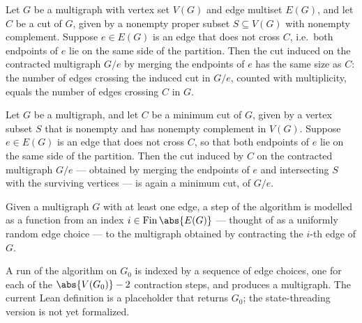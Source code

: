 \begin{lemma}
\label{cut_size_preserved}
\leanok
{}
Let $G$ be a multigraph with vertex set $V(G)$ and edge multiset $E(G)$, and let $C$ be
a cut of $G$, given by a nonempty proper subset $S \subseteq V(G)$ with nonempty
complement. Suppose $e \in E(G)$ is an edge that does not cross $C$, i.e.\ both
endpoints of $e$ lie on the same side of the partition. Then the cut induced on the
contracted multigraph $G/e$ by merging the endpoints of $e$ has the same size as $C$:
the number of edges crossing the induced cut in $G/e$, counted with multiplicity, equals
the number of edges crossing $C$ in $G$.
\end{lemma}

\begin{lemma}
\label{mincut_preserved_of_non_crossing}
\leanok
{}
Let $G$ be a multigraph, and let $C$ be a minimum cut of $G$, given by a vertex subset
$S$ that is nonempty and has nonempty complement in $V(G)$. Suppose $e \in E(G)$ is an
edge that does not cross $C$, so that both endpoints of $e$ lie on the same side of the
partition. Then the cut induced by $C$ on the contracted multigraph $G/e$ — obtained by
merging the endpoints of $e$ and intersecting $S$ with the surviving vertices — is again
a minimum cut, of $G/e$.
\end{lemma}

\begin{definition}
\label{kargerStep}
\leanok
{}
Given a multigraph $G$ with at least one edge, a step of the algorithm is modelled as a
function from an index $i \in \mathrm{Fin}\,\abs{E(G)}$ — thought of as a uniformly
random edge choice — to the multigraph obtained by contracting the $i$-th edge of $G$.
\end{definition}

\begin{definition}
\label{kargerRun}
\leanok
{}
A run of the algorithm on $G_0$ is indexed by a sequence of edge choices, one for each
of the $\abs{V(G_0)} - 2$ contraction steps, and produces a multigraph. The current
Lean definition is a placeholder that returns $G_0$; the state-threading version is not
yet formalized.
\end{definition}

